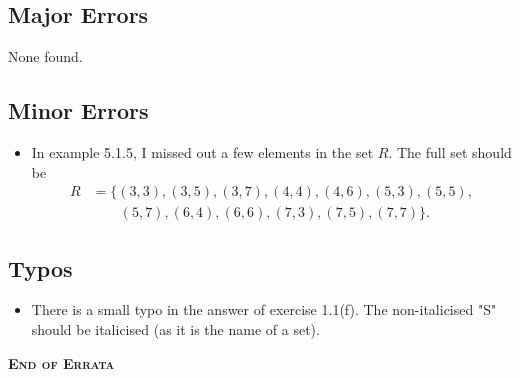 \documentclass[
    a4paper,
    chapterprefix,
    DIV=9
]{scrartcl}
\begin{document}
\subsection*{Major Errors}
None found.

\subsection*{Minor Errors}
\begin{itemize}
    \item In example 5.1.5, I missed out a few elements in the set $R$. The full set should be
    \begin{align*}
        R &= \{(3, 3), (3, 5), (3, 7), (4, 4), (4, 6), (5, 3), (5, 5),\\
        &\quad\quad(5, 7), (6, 4), (6, 6), (7, 3), (7, 5), (7, 7)\}.
    \end{align*}
\end{itemize}

\subsection*{Typos}
\begin{itemize}
    \item There is a small typo in the answer of exercise 1.1(f). The non-italicised "S" should be italicised (as it is the name of a set).
\end{itemize}

\begin{center}
    \vfill
    {\Large\bfseries\scshape End of Errata}
\end{center}
\end{document}
